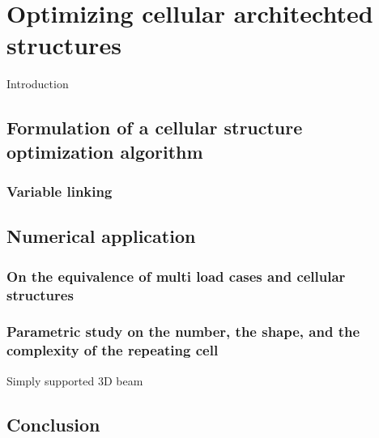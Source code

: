 \setchapterpreamble[u]{\margintoc}
\chapter{Optimizing cellular architechted structures}
Introduction
\section{Formulation of a cellular structure optimization algorithm}
\subsection{Variable linking}
\section{Numerical application}
\subsection{On the equivalence of multi load cases and cellular structures}
\subsection{Parametric study on the number, the shape, and the complexity of the repeating cell}
Simply supported 3D beam
\section{Conclusion}